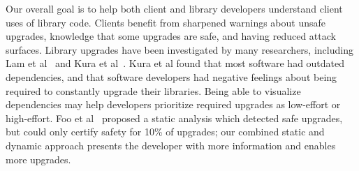 Our overall goal is to help both client and library developers understand
client uses of library code. Clients benefit from sharpened warnings
about unsafe upgrades, knowledge that some upgrades are safe, and
having reduced attack surfaces. Library upgrades have been
investigated by many researchers, including Lam et
al~\cite{lam20:_puttin_seman_seman_version} and Kura et al~\cite{kula18:_do_devel_updat_their_librar_depen}. Kura et al found that most
software had outdated dependencies, and that software developers had
negative feelings about being required to constantly upgrade their
libraries. Being able to visualize dependencies may help developers
prioritize required upgrades as low-effort or high-effort.
Foo et al~\cite{foo18:_effic_static_check_librar_updat}
proposed a static analysis which detected safe upgrades, but could
only certify safety for 10\% of upgrades; our combined static and
dynamic approach presents the developer with more information and
enables more upgrades. 
